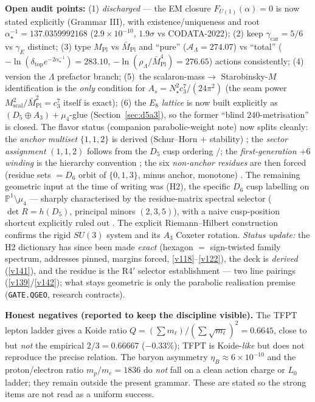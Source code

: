 \documentclass[11pt,a4paper]{article}
\newcommand{\MPl}{M_{\mathrm{Pl}}}
\newcommand{\Mbar}{\bar M_{\mathrm{Pl}}}
\newcommand{\cthree}{c_3}
\newcommand{\dtop}{\delta_{\mathrm{top}}}
\newcommand{\ainv}{\alpha^{-1}_\star}
\newcommand{\AL}{\mathcal A_\Lambda}
\theoremstyle{definition}
\begin{document}
\noindent\textbf{Open audit points:} (1) \emph{discharged} --- the EM closure $F_{U(1)}(\alpha)=0$ is now
stated explicitly (Grammar III), with existence/uniqueness and root $\ainv=137.0359992168$
($2.9\times10^{-10}$, $1.9\sigma$ vs CODATA-2022); (2) keep $\gamma_{\mathrm{car}}=5/6$ vs $\gamma_E$ distinct; (3) type $\MPl$ vs $\Mbar$ and ``pure''
($\AL=274.07$) vs ``total'' ($-\ln(\dtop e^{-2\ainv})=283.10$, $-\ln(\rho_\Lambda/\Mbar^4)=276.65$)
actions consistently; (4) version the $\Lambda$ prefactor branch; (5)~the scalaron-mass$\to$
Starobinsky-$M$ identification is the \emph{only} condition for $A_s=N_\star^2\cthree^7/(24\pi^2)$
(the seam power $M_{\mathrm{scal}}^2/\Mbar^2=\cthree^7$ itself is exact); (6) the $E_8$ \emph{lattice} is
now built explicitly as $(D_5\oplus A_3)+\mu_4$-glue (Section~\ref{sec:d5a3}), so the former ``blind
$240$-metrisation'' is closed. The flavor status (companion parabolic-weight note) now splits cleanly:
the \emph{anchor multiset} $\{1,1,2\}$ is derived (Schur--Horn $+$ stability) \mE; the \emph{sector
assignment} $(1,1,2)$ follows from the $D_5$ cusp ordering \mE/\mC; the \emph{first-generation $+6$
winding} is the hierarchy convention \mC; the six \emph{non-anchor residues} are then forced (residue
sets $=D_6$ orbit of $\{0,1,3\}$, minus anchor, monotone) \mE. The remaining geometric input at the time
of writing was (H2), the specific $D_6$ cusp labelling on $\mathbb P^1\setminus\mu_4$ --- sharply
characterised by the residue-matrix spectral selector ($\det R=h(D_5)$, principal minors $(2,3,5)$),
with a naive cusp-position shortcut explicitly ruled out \mC. The explicit Riemann--Hilbert construction
confirms the rigid $SU(3)$ system and its $A_3$ Coxeter rotation. \emph{Status update:} the H2
dictionary has since been made \emph{exact} (hexagon $=$ sign-twisted family spectrum, addresses pinned,
margins forced, \vref{v118}--\vref{v122}), the deck is \emph{derived} (\vref{v141}), and the residue is
the R4$'$ selector establishment --- two line pairings (\vref{v139}/\vref{v142}); what stays geometric is
only the parabolic realisation premise (\texttt{GATE.QGEO}, research contracts).

\medskip
\noindent\textbf{Honest negatives (reported to keep the discipline visible).} The TFPT lepton ladder
gives a Koide ratio $Q=(\sum m_\ell)/(\sum\sqrt{m_\ell})^2=0.6645$, close to but \emph{not} the
empirical $2/3=0.66667$ ($-0.33\%$); TFPT is Koide-\emph{like} but does not reproduce the precise
relation. The baryon asymmetry $\eta_B\approx6\times10^{-10}$ and the proton/electron ratio
$m_p/m_e=1836$ do \emph{not} fall on a clean action charge or $L_0$ ladder; they remain outside the
present grammar. These are stated so the strong items are not read as a uniform success.
\end{document}
